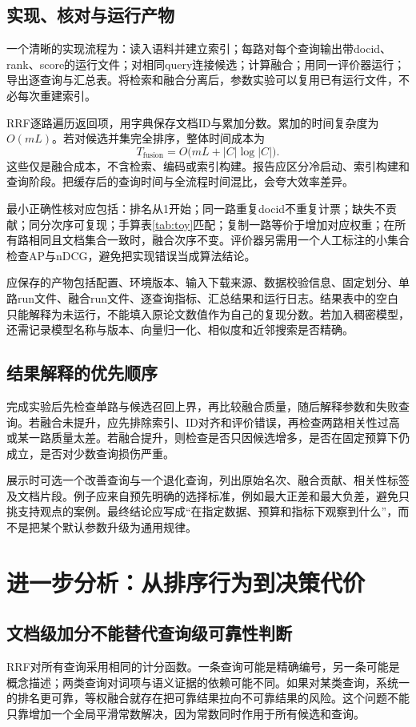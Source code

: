 \documentclass[sigconf,nonacm]{acmart}
\begin{document}
\subsection{实现、核对与运行产物}
一个清晰的实现流程为：读入语料并建立索引；每路对每个查询输出带docid、rank、score的运行文件；对相同query连接候选；计算融合；用同一评价器运行；导出逐查询与汇总表。将检索和融合分离后，参数实验可以复用已有运行文件，不必每次重建索引。

RRF逐路遍历返回项，用字典保存文档ID与累加分数。累加的时间复杂度为$O(mL)$。若对候选并集完全排序，整体时间成本为
\begin{equation}
 T_{\mathrm{fusion}}=O\bigl(mL+|C|\log|C|\bigr).
\end{equation}
这些仅是融合成本，不含检索、编码或索引构建。报告应区分冷启动、索引构建和查询阶段。把缓存后的查询时间与全流程时间混比，会夸大效率差异。

最小正确性核对应包括：排名从1开始；同一路重复docid不重复计票；缺失不贡献；同分次序可复现；手算表\ref{tab:toy}匹配；复制一路等价于增加对应权重；在所有路相同且文档集合一致时，融合次序不变。评价器另需用一个人工标注的小集合检查AP与nDCG，避免把实现错误当成算法结论。

应保存的产物包括配置、环境版本、输入下载来源、数据校验信息、固定划分、单路run文件、融合run文件、逐查询指标、汇总结果和运行日志。结果表中的空白只能解释为未运行，不能填入原论文数值作为自己的复现分数。若加入稠密模型，还需记录模型名称与版本、向量归一化、相似度和近邻搜索是否精确。

\subsection{结果解释的优先顺序}
完成实验后先检查单路与候选召回上界，再比较融合质量，随后解释参数和失败查询。若融合未提升，应先排除索引、ID对齐和评价错误，再检查两路相关性过高或某一路质量太差。若融合提升，则检查是否只因候选增多，是否在固定预算下仍成立，是否对少数查询损伤严重。

展示时可选一个改善查询与一个退化查询，列出原始名次、融合贡献、相关性标签及文档片段。例子应来自预先明确的选择标准，例如最大正差和最大负差，避免只挑支持观点的案例。最终结论应写成“在指定数据、预算和指标下观察到什么”，而不是把某个默认参数升级为通用规律。

\section{进一步分析：从排序行为到决策代价}
\subsection{文档级加分不能替代查询级可靠性判断}
RRF对所有查询采用相同的计分函数。一条查询可能是精确编号，另一条可能是概念描述；两类查询对词项与语义证据的依赖可能不同。如果对某类查询，系统一的排名更可靠，等权融合就存在把可靠结果拉向不可靠结果的风险。这个问题不能只靠增加一个全局平滑常数解决，因为常数同时作用于所有候选和查询。
\end{document}
